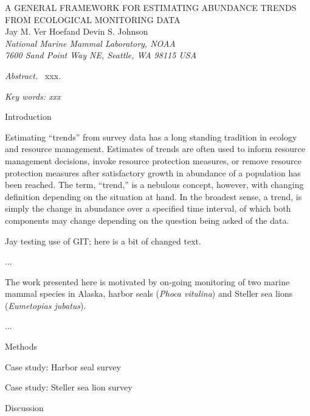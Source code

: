 \documentclass[12pt,letter]{report}
\begin{document}
\begin{center}
\Large A GENERAL FRAMEWORK FOR ESTIMATING ABUNDANCE TRENDS FROM ECOLOGICAL MONITORING DATA
\bigskip\\
\normalsize
{\sc Jay M. Ver Hoef\footnotemark[1] and Devin S. Johnson}\smallskip\\
{\em National Marine Mammal Laboratory, NOAA\\
7600 Sand Point Way NE, Seattle,
WA 98115 USA }\\ \medskip
\end{center}

\raggedright \setlength{\parindent}{0.3in}
\renewcommand{\baselinestretch}{1.7}\normalsize
{}
 \linenumbers

{\em Abstract.\ } xxx.

{\em Key words: xxx}

\centerline{\sc Introduction}

Estimating ``trends'' from survey data has a long standing tradition in ecology and resource management. Estimates of trends are often used to inform resource management decisions, invoke resource protection measures, or remove resource protection measures after satisfactory growth in abundance of a population has been reached. The term, ``trend,'' is a nebulous concept, however, with changing definition depending on the situation at hand. In the broadest sense, a trend, is simply the change in abundance over a specified time interval, of which both components may change depending on the question being asked of the data.   

Jay testing use of GIT; here is a bit of changed text.

...

The work presented here is motivated by on-going monitoring of two marine mammal species in Alaska, harbor seals ({\it Phoca vitulina}) and Steller sea lions ({\it Eumetopias jubatus}).

...
   
\centerline{\sc Methods}

\centerline{\sc Case study: Harbor seal survey}

\centerline{\sc Case study: Steller sea lion survey}

\centerline{\sc Discussion}
\end{document}
